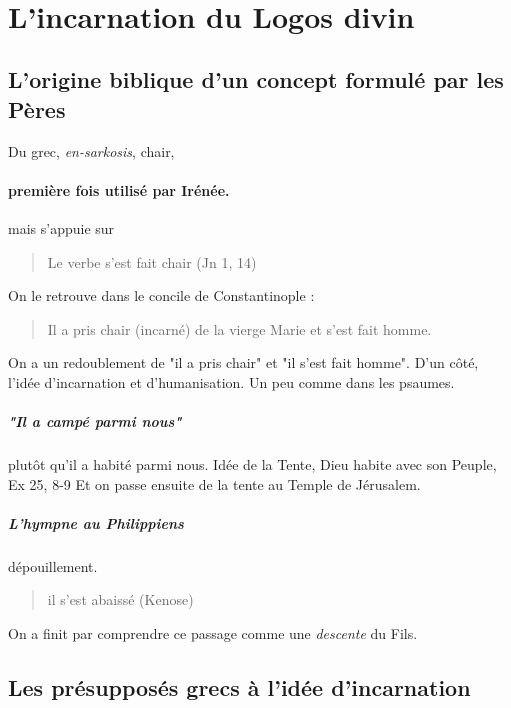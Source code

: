  ~
  \hypertarget{lincarnation-du-logos-divin}{%
  \section{L'incarnation du Logos
  divin}\label{lincarnation-du-logos-divin}}

  
  
  
    \subsection{L'origine biblique d'un concept formulé par les Pères}
  
  \begin{Def}[incarnation]
  Du grec, \emph{en-sarkosis},  chair, 
  \end{Def}
  \paragraph{première fois utilisé par Irénée. } mais s'appuie sur
  \begin{quote}
  Le verbe s'est fait chair (Jn 1, 14)    
  \end{quote}
   
   On le retrouve dans le concile de Constantinople : 
   \begin{quote}
       Il a pris chair (incarné) de la vierge Marie et s'est fait homme.
   \end{quote}
  
  On a un redoublement de "il a pris chair" et "il s'est fait homme". D'un côté, l'idée d'incarnation et d'humanisation. Un peu comme dans les psaumes.
  
  \subparagraph{"Il a campé parmi nous"} plutôt qu'il a habité parmi nous. Idée de la Tente, Dieu habite avec son Peuple, Ex 25, 8-9 
Et on passe ensuite de la tente au Temple de Jérusalem. 

\subparagraph{L'hympne au Philippiens} dépouillement.  
\begin{quote}
    il s'est abaissé (Kenose)
\end{quote}
On a finit par comprendre ce passage comme une \textit{descente} du Fils.   



    \subsection{Les présupposés grecs à l'idée d'incarnation}

